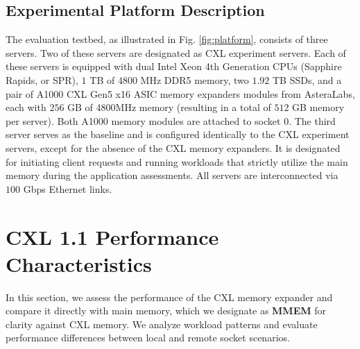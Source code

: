 \subsection{Experimental Platform Description}
The evaluation testbed, as illustrated in Fig. \ref{fig:platform}, consists of three servers. Two of these servers are designated as CXL experiment servers. Each of these servers is equipped with dual Intel Xeon 4th Generation CPUs (Sapphire Rapids, or SPR), $1$ TB of $4800$ MHz DDR5 memory, two $1.92$ TB SSDs, and a pair of A1000 CXL Gen5 x16 ASIC memory expanders modules from AsteraLabs, each with $256$ GB of 4800MHz memory (resulting in a total of $512$ GB memory per server). Both A1000 memory modules are attached to socket $0$. The third server serves as the baseline and is configured identically to the CXL experiment servers, except for the absence of the CXL memory expanders. It is designated for initiating client requests and running workloads that strictly utilize the main memory during the application assessments. All servers are interconnected via $100$ Gbps Ethernet links.









\section{CXL 1.1 Performance Characteristics}
\label{sec:micro}


In this section, we assess the performance of the CXL memory expander and compare it directly with main memory, which we designate as \textbf{MMEM} for clarity against CXL memory. We analyze workload patterns and evaluate performance differences between local and remote socket scenarios.

